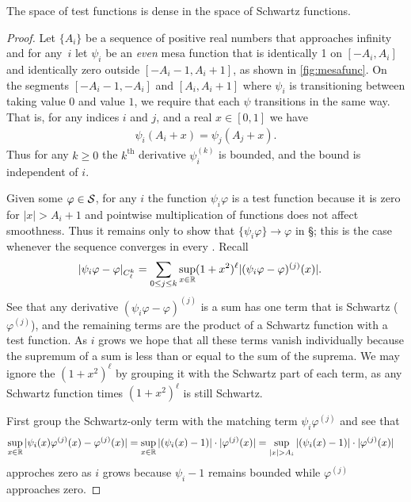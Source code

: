     \begin{lemma}
      \label{lemma:ddenseins}
      The space of test functions is dense in the space of Schwartz functions.
    \end{lemma}
    \begin{proof}
      Let $\{A_i\}$ be a sequence of positive real numbers that approaches infinity and for any~$i$ let $\psi_i$ be an \emph{even} mesa function that is identically 1 on $[-A_i,A_i]$ and identically zero outside $[-A_i-1,A_i+1]$, as shown in \cref{fig:mesafunc}.
      On the segments $[-A_i-1,-A_i]$ and $[A_i,A_i+1]$ where $\psi_i$ is transitioning between taking value $0$ and value $1$, we require that each $\psi$ transitions in the same way.
      That is, for any indices $i$ and $j$, and a real $x\in[0,1]$ we have
      \begin{align*}
        \psi_i(A_i+x) = \psi_j(A_j+x) \text{.}
      \end{align*}
      Thus for any $k\ge0$ the $k^{\text{th}}$ derivative $\psi_i^{(k)}$ is bounded, and the bound is independent of $i$.

      Given some $\varphi\in\S$, for any $i$ the function $\psi_i\varphi$ is a test function because it is zero for $|x|>A_i+1$ and pointwise multiplication of functions does not affect smoothness.
      Thus it remains only to show that $\{\psi_i\varphi\}\rightarrow\varphi$ in \S; this is the case whenever the sequence converges in every \Ckl.
      Recall
      \begin{align*}
        |\psi_i\varphi - \varphi|_\Ckl
        &= \sum_{0\le j\le k} \sup_{x\in\R} (1+x^2)^\ell |(\psi_i\varphi-\varphi)^{(j)}(x)| \text{.}
      \end{align*}
      See that any derivative $(\psi_i\varphi-\varphi)^{(j)}$ is a sum has one term that is Schwartz ($\varphi^{(j)}$), and the remaining terms are the product of a Schwartz function with a test function.
      As $i$ grows we hope that all these terms vanish individually because the supremum of a sum is less than or equal to the sum of the suprema.
      We may ignore the $(1+x^2)^\ell$ by grouping it with the Schwartz part of each term, as any Schwartz function times $(1+x^2)^\ell$ is still Schwartz.

      First group the Schwartz-only term with the matching term $\psi_i\varphi^{(j)}$ and see that 
      \begin{align*}
        \sup_{x\in\R} |\psi_i(x)\varphi^{(j)}(x)-\varphi^{(j)}(x)|
        &= \sup_{x\in\R} |(\psi_i(x)-1)|\cdot|\varphi^{(j)}(x)|
        = \sup_{|x|>A_i} |(\psi_i(x)-1)|\cdot|\varphi^{(j)}(x)|
      \end{align*}
      approches zero as $i$ grows because $\psi_i-1$ remains bounded while $\varphi^{(j)}$ approaches zero.
      

\end{proof}
